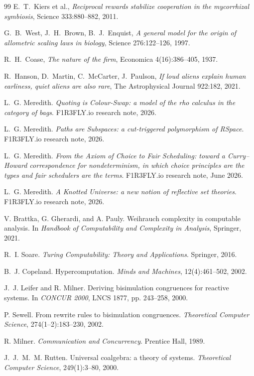 \begin{thebibliography}{99}
E.~T.~Kiers et al., \emph{Reciprocal rewards stabilize cooperation in the mycorrhizal symbiosis}, Science 333:880--882, 2011.

G.~B.~West, J.~H.~Brown, B.~J.~Enquist, \emph{A general model for the origin of allometric scaling laws in biology}, Science 276:122--126, 1997.

R.~H.~Coase, \emph{The nature of the firm}, Economica 4(16):386--405, 1937.

R.~Hanson, D.~Martin, C.~McCarter, J.~Paulson, \emph{If loud aliens explain human earliness, quiet aliens are also rare}, The Astrophysical Journal 922:182, 2021.


L.~G. Meredith. \emph{Quoting is Colour-Swap: a model of the rho calculus in the
category of bags}. F1R3FLY.io research note, 2026.

L.~G. Meredith. \emph{Paths are Subspaces: a cut-triggered polymorphism of RSpace}.
F1R3FLY.io research note, 2026.

L.~G. Meredith. \emph{From the Axiom of Choice to Fair Scheduling: toward a
Curry--Howard correspondence for nondeterminism, in which choice principles are the
types and fair schedulers are the terms}. F1R3FLY.io research note, June 2026.

L.~G. Meredith. \emph{A Knotted Universe: a new notion of reflective set theories}.
F1R3FLY.io research note, 2026.

V. Brattka, G. Gherardi, and A. Pauly. Weihrauch complexity in computable analysis.
In \emph{Handbook of Computability and Complexity in Analysis}, Springer, 2021.

R.~I. Soare. \emph{Turing Computability: Theory and Applications}. Springer, 2016.

B.~J. Copeland. Hypercomputation. \emph{Minds and Machines}, 12(4):461--502, 2002.

J.~J. Leifer and R. Milner. Deriving bisimulation congruences for reactive systems.
In \emph{CONCUR 2000}, LNCS 1877, pp. 243--258, 2000.

P. Sewell. From rewrite rules to bisimulation congruences.
\emph{Theoretical Computer Science}, 274(1--2):183--230, 2002.

R. Milner. \emph{Communication and Concurrency}. Prentice Hall, 1989.

J.~J.~M.~M. Rutten. Universal coalgebra: a theory of systems.
\emph{Theoretical Computer Science}, 249(1):3--80, 2000.


\end{thebibliography}
